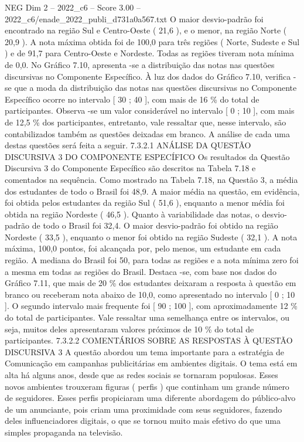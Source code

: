 \begin{textsample}{NEG Dim 2 – 2022\_c6 – Score 3.00 – 2022\_c6/enade\_2022\_publi\_d731a0a567.txt}
O maior desvio-padrão foi encontrado na região Sul e Centro-Oeste ( 21,6 ), e o menor, na região Norte ( 20,9 ).
A nota máxima obtida foi de 100,0 para três regiões ( Norte, Sudeste e Sul ) e de 91,7 para Centro-Oeste e Nordeste.
Todas as regiões tiveram nota mínima de 0,0.
No Gráfico 7.10, apresenta -se a distribuição das notas nas questões discursivas no Componente Específico.
À luz dos dados do Gráfico 7.10, verifica -se que a moda da distribuição das notas nas questões discursivas no Componente Específico ocorre no intervalo [ 30 ; 40 ], com mais de 16 \% do total de participantes.
Observa -se um valor considerável no intervalo [ 0 ; 10 ], com mais de 12,5 \% dos participantes, entretanto, vale ressaltar que, nesse intervalo, são contabilizados também as questões deixadas em branco.
A análise de cada uma destas questões será feita a seguir. 7.3.2.1 ANÁLISE DA QUESTÃO DISCURSIVA 3 DO COMPONENTE ESPECÍFICO Os resultados da Questão Discursiva 3 do Componente Específico são descritos na Tabela 7.18 e comentados na sequência.
Como mostrado na Tabela 7.18, na Questão 3, a média dos estudantes de todo o Brasil foi 48,9.
A maior média na questão, em evidência, foi obtida pelos estudantes da região Sul ( 51,6 ), enquanto a menor média foi obtida na região Nordeste ( 46,5 ).
Quanto à variabilidade das notas, o desvio-padrão de todo o Brasil foi 32,4.
O maior desvio-padrão foi obtido na região Nordeste ( 33,5 ), enquanto o menor foi obtido na região Sudeste ( 32,1 ).
A nota máxima, 100,0 pontos, foi alcançada por, pelo menos, um estudante em cada região.
A mediana do Brasil foi 50, para todas as regiões e a nota mínima zero foi a mesma em todas as regiões do Brasil.
Destaca -se, com base nos dados do Gráfico 7.11, que mais de 20 \% dos estudantes deixaram a resposta à questão em branco ou receberam nota abaixo de 10,0, como apresentado no intervalo [ 0 ; 10 ].
O segundo intervalo mais frequente foi [ 90 ; 100 ], com aproximadamente 12 \% do total de participantes.
Vale ressaltar uma semelhança entre os intervalos, ou seja, muitos deles apresentaram valores próximos de 10 \% do total de participantes. 7.3.2.2 COMENTÁRIOS SOBRE AS RESPOSTAS À QUESTÃO DISCURSIVA 3 A questão abordou um tema importante para a estratégia de Comunicação em campanhas publicitárias em ambientes digitais.
O tema está em alta há alguns anos, desde que as redes sociais se tornaram populosas.
Esses novos ambientes trouxeram figuras ( perfis ) que continham um grande número de seguidores.
Esses perfis propiciaram uma diferente abordagem do público-alvo de um anunciante, pois criam uma proximidade com seus seguidores, fazendo deles influenciadores digitais, o que se tornou muito mais efetivo do que uma simples propaganda na televisão.

\end{textsample}
